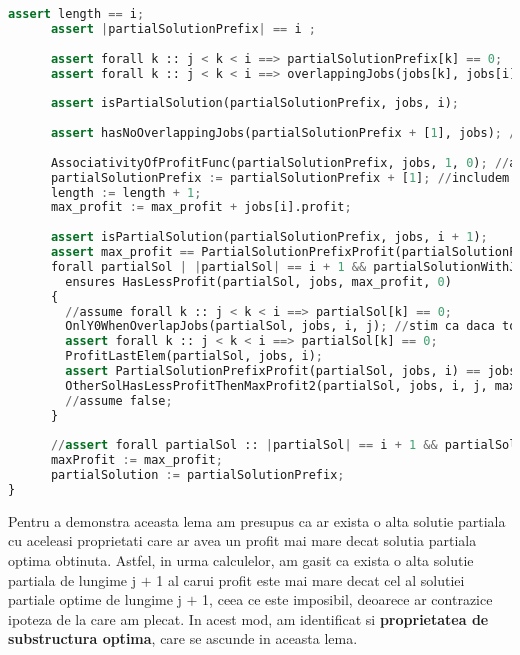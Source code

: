\begin{lstlisting}[language = Python]
      assert length == i;
      assert |partialSolutionPrefix| == i ;
    
      assert forall k :: j < k < i ==> partialSolutionPrefix[k] == 0;
      assert forall k :: j < k < i ==> overlappingJobs(jobs[k], jobs[i]); //stim ca toate job-urile strict mai mari decat j se suprapun cu i
    
      assert isPartialSolution(partialSolutionPrefix, jobs, i);
    
      assert hasNoOverlappingJobs(partialSolutionPrefix + [1], jobs); // lemmas before
    
      AssociativityOfProfitFunc(partialSolutionPrefix, jobs, 1, 0); //apelam inainte sa adaugam 1
      partialSolutionPrefix := partialSolutionPrefix + [1]; //includem si job-ul i (solutia partiala ce contine job-ul i)
      length := length + 1;
      max_profit := max_profit + jobs[i].profit;
    
      assert isPartialSolution(partialSolutionPrefix, jobs, i + 1);
      assert max_profit == PartialSolutionPrefixProfit(partialSolutionPrefix, jobs, 0); //lemma
      forall partialSol | |partialSol| == i + 1 && partialSolutionWithJobI(partialSol, jobs, i)
        ensures HasLessProfit(partialSol, jobs, max_profit, 0)
      {
        //assume forall k :: j < k < i ==> partialSol[k] == 0;
        OnlY0WhenOverlapJobs(partialSol, jobs, i, j); //stim ca daca toate job-urile dintre i si j se suprapun, inseamna ca putem avea doar 0-uri
        assert forall k :: j < k < i ==> partialSol[k] == 0;
        ProfitLastElem(partialSol, jobs, i);
        assert PartialSolutionPrefixProfit(partialSol, jobs, i) == jobs[i].profit;
        OtherSolHasLessProfitThenMaxProfit2(partialSol, jobs, i, j, max_profit, allSol, dp);
        //assume false;
      }
    
      //assert forall partialSol :: |partialSol| == i + 1 && partialSolutionWithJobI(partialSol, jobs, i) ==> HasLessProfit(partialSol, jobs, max_profit, 0) ;
      maxProfit := max_profit;
      partialSolution := partialSolutionPrefix;
}
\end{lstlisting}

Pentru a demonstra aceasta lema am presupus ca ar exista o alta solutie partiala cu aceleasi proprietati care ar avea un profit mai mare decat solutia partiala optima obtinuta. Astfel, in urma calculelor, am gasit ca exista o alta solutie partiala de lungime j $+$ 1 al carui profit este mai mare decat cel al solutiei partiale optime de lungime j $+$ 1, ceea ce este imposibil, deoarece ar contrazice ipoteza de la care am plecat. In acest mod, am identificat si \textbf{proprietatea de substructura optima}, care se ascunde in aceasta lema. 

